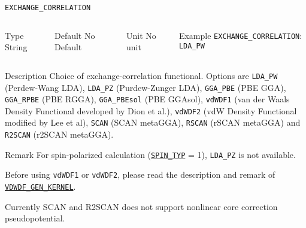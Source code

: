 \documentclass[xcolor=dvipsnames,t]{beamer}
\begin{document}
\begin{frame}[allowframebreaks]{\texttt{EXCHANGE\_CORRELATION}} \label{EXCHANGE_CORRELATION}
\vspace*{-12pt}
\begin{columns}
\begin{block}{Type}
String
\end{block}

\begin{block}{Default}
No Default
\end{block}

\begin{block}{Unit}
No unit
\end{block}

\begin{block}{Example}
\texttt{EXCHANGE\_CORRELATION}: \texttt{LDA\_PW}
\end{block}
\end{columns}

\begin{block}{Description}
  Choice of exchange-correlation functional. Options are \texttt{LDA\_PW} (Perdew-Wang LDA), \texttt{LDA\_PZ} (Purdew-Zunger LDA), \texttt{GGA\_PBE} (PBE GGA), \texttt{GGA\_RPBE} (PBE RGGA), \texttt{GGA\_PBEsol} (PBE GGAsol), \texttt{vdWDF1} (van der Waals Density Functional developed by Dion et al.), \texttt{vdWDF2} (vdW Density Functional modified by Lee et al), \texttt{SCAN} (SCAN metaGGA), \texttt{RSCAN} (rSCAN metaGGA) and \texttt{R2SCAN} (r2SCAN metaGGA).
\end{block}

\begin{block}{Remark}
For spin-polarized calculation (\hyperlink{SPIN_TYP}{\texttt{SPIN\_TYP}} = 1), \texttt{LDA\_PZ} is not available.

Before using \texttt{vdWDF1} or \texttt{vdWDF2}, please read the description and remark of \hyperlink{VDWDF_GEN_KERNEL}{\texttt{VDWDF\_GEN\_KERNEL}}.

Currently SCAN and R2SCAN does not support nonlinear core correction pseudopotential.
\end{block}

\end{frame}
\end{document}
